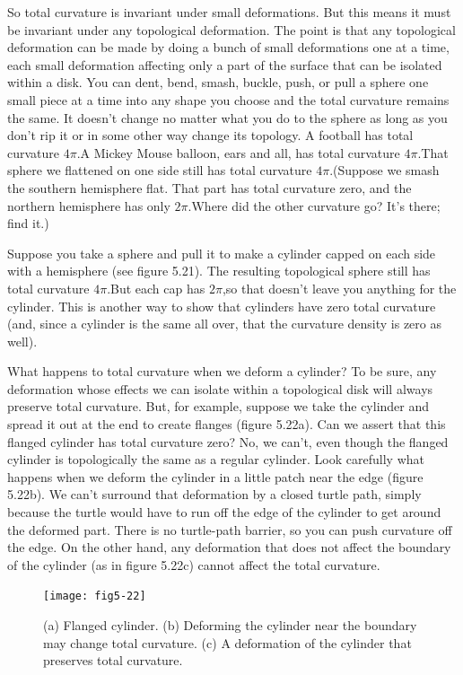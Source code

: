 \documentclass{book}
\begin{document}
So total curvature is invariant under small deformations. But this
means it must be invariant under any topological deformation. The
point is that any topological deformation can be made by doing a bunch
of small deformations one at a time, each small deformation affecting
only a part of the surface that can be isolated within a disk.
You can dent, bend, smash, buckle, push, or pull a sphere one small
piece at a time into any shape you choose and the total curvature remains
the same. It doesn't change no matter what you do to the sphere as
long as you don't rip it or in some other way change its topology. A
football has total curvature $4\pi$.A Mickey Mouse balloon, ears and all,
has total curvature $4\pi$.That sphere we flattened on one side still has
total curvature $4\pi$.(Suppose we smash the southern hemisphere flat.
That part has total curvature zero, and the northern hemisphere has
only $2\pi$.Where did the other curvature go? It's there; find it.)

Suppose you take a sphere and pull it to make a cylinder capped on
each side with a hemisphere (see figure 5.21). The resulting topological
sphere still has total curvature $4 \pi$.But each cap has $2 \pi$,so that doesn't
leave you anything for the cylinder. This is another way to show that
cylinders have zero total curvature (and, since a cylinder is the same all
over, that the curvature density is zero as well).

What happens to total curvature when we deform a cylinder? To be
sure, any deformation whose effects we can isolate within a topological
disk will always preserve total curvature. But, for example, suppose we
take the cylinder and spread it out at the end to create flanges (figure
5.22a). Can we assert that this flanged cylinder has total curvature
zero? No, we can't, even though the flanged cylinder is topologically
the same as a regular cylinder. Look carefully what happens when we
deform the cylinder in a little patch near the edge (figure 5.22b). We
can't surround that deformation by a closed turtle path, simply because
the turtle would have to run off the edge of the cylinder to get around
the deformed part. There is no turtle-path barrier, so you can push
curvature off the edge. On the other hand, any deformation that does
not affect the boundary of the cylinder (as in figure 5.22c) cannot affect
the total curvature.

\begin{figure}
\begin{center}
\texttt{[image: fig5-22]}
\caption{(a) Flanged cylinder. (b) Deforming the cylinder near the boundary may change total curvature. (c) A deformation of the cylinder that preserves total curvature.}
\end{center}
\end{figure}
\end{document}
